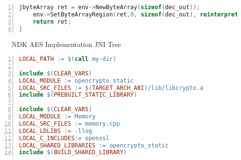 \begin{appendices}
\begin{lstlisting}[language=C++, caption=AES Decrypt(), label=nkd_aes_decrypt,
numbers=left]
    jbyteArray ret = env->NewByteArray(sizeof(dec_out));
    env->SetByteArrayRegion(ret,0, sizeof(dec_out), reinterpret_cast<jbyte *>(dec_out));
    return ret;
}
\end{lstlisting}

\begin{figure}[htb]
\caption[NDK AES Implementation JNI Tree]{NDK AES Implementation JNI Tree}
\label{fig:ndk_aes_impl_tree}
\end{figure}
\begin{lstlisting}[language=make, caption=Memory/Android.mk, label=nkd_aes_make, numbers=left]
LOCAL_PATH := $(call my-dir)

include $(CLEAR_VARS)
LOCAL_MODULE := opencrypto_static
LOCAL_SRC_FILES := $(TARGET_ARCH_ABI)/lib/libcrypto.a
include $(PREBUILT_STATIC_LIBRARY)

include $(CLEAR_VARS)
LOCAL_MODULE := Memory
LOCAL_SRC_FILES := memory.cpp
LOCAL_LDLIBS := -llog
LOCAL_C_INCLUDES:= openssl
LOCAL_SHARED_LIBRARIES := opencrypto_static
include $(BUILD_SHARED_LIBRARY)
\end{lstlisting}


\end{appendices}
